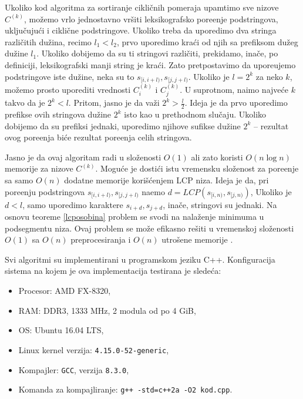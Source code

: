 
Ukoliko kod algoritma za sortiranje cikli\v cnih pomeraja upamtimo sve nizove $C^{(k)}$, mo\v zemo vrlo jednostavno vr\v siti leksikografsko pore\dj enje podstringova, uklju\v cuju\' ci i cikli\v cne podstringove. Ukoliko treba da uporedimo dva stringa razli\v citih du\v zina, recimo $l_1 < l_2$, prvo uporedimo kra\' ci od njih sa prefiksom du\v zeg du\v zine $l_1$. Ukoliko dobijemo da su ti stringovi razli\v citi, prekidamo, ina\v ce, po definiciji, leksikografski manji string je kra\' ci. Zato pretpostavimo da upore\dj ujemo podstringove iste du\v zine, neka su to $s_{[i, i+l)}, s_{[j, j+l)}$.  Ukoliko je $l = 2^k$ za neko $k$, mo\v zemo prosto uporediti vrednosti $C^{(k)}_i$ i $C^{(k)}_j$. U suprotnom, na\dj imo najve\' ce $k$ takvo da je $2^k < l$. Pritom, jasno je da va\v zi $2^k > \frac{l}{2}$. Ideja je da prvo uporedimo prefikse ovih stringova du\v zine $2^k$ isto kao u prethodnom slu\v caju. Ukoliko dobijemo da su prefiksi jednaki, uporedimo njihove sufikse du\v zine $2^k$ -- rezultat ovog pore\dj enja bi\' ce rezultat pore\dj enja celih stringova.

Jasno je da ovaj algoritam radi u slo\v zenosti $O(1)$ ali zato koristi $O(n \log n)$ memorije za nizove $C^{(k)}$. Mogu\' ce je dosti\' ci istu vremensku slo\v zenost za pore\dj enje sa samo $O(n)$ dodatne memorije kori\v s\' cenjem LCP niza. Ideja je da, pri pore\dj enju podstringova $s_{[i, i+l)}, s_{[j, j+l)}$ na\dj emo $d = LCP(s_{[i, n)}, s_{[j, n)})$, Ukoliko je $d < l$, samo uporedimo karaktere $s_{i+d}, s_{j+d}$, ina\v ce, stringovi su jednaki. Na osnovu teoreme \ref{lcposobina} problem se svodi na nala\v zenje minimuma u podsegmentu niza. Ovaj problem se mo\v ze efikasno re\v siti u vremenskoj slo\v zenosti $O(1)$ sa $O(n)$ preprocesiranja i $O(n)$ utro\v sene memorije \cite{lcarmq}.



Svi algoritmi su implementirani u programskom jeziku C++. Konfiguracija sistema na kojem je ova implementacija testirana je slede\' ca:

\begin{itemize}
    \item Procesor: AMD FX-8320,
    \item RAM: DDR3, 1333 MHz, 2 modula od po 4 GiB,
    \item OS: Ubuntu 16.04 LTS,
    \item Linux kernel verzija: \texttt{4.15.0-52-generic},
    \item Kompajler: \texttt{GCC}, verzija \texttt{8.3.0},
    \item Komanda za kompajliranje: \texttt{g++ -std=c++2a -O2 kod.cpp}.
\end{itemize}

